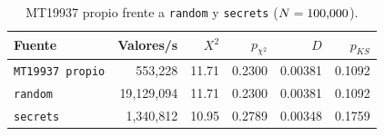 \begin{table}[htbp]\centering
\caption{MT19937 propio frente a \texttt{random} y \texttt{secrets} ($N=100{,}000$).}
\label{tab:librerias}
\small
\begin{tabular}{l|r|r|r|r|r}
\toprule
Fuente & Valores/s & $X^2$ & $p_{\chi^2}$ & $D$ & $p_{KS}$ \\
\midrule
\texttt{MT19937 propio} & 553{,}228 & 11.71 & 0.2300 & 0.00381 & 0.1092 \\
\texttt{random} & 19{,}129{,}094 & 11.71 & 0.2300 & 0.00381 & 0.1092 \\
\texttt{secrets} & 1{,}340{,}812 & 10.95 & 0.2789 & 0.00348 & 0.1759 \\
\bottomrule
\end{tabular}
\end{table}

